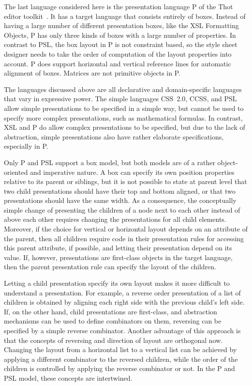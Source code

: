  The last language considered here is the presentation language P of the Thot editor toolkit~\cite{thot}. It has a target language that consists entirely of boxes. Instead of having a large number of different presentation boxes, like the XSL Formatting Objects, P has only three kinds of boxes with a large number of properties. In contrast to PSL, the box layout in P is not constraint based, so the style sheet designer needs to take the order of computation of the layout properties into account. P does support horizontal and vertical reference lines for automatic alignment of boxes. Matrices are not primitive objects in P.

 The languages discussed above are all declarative and domain-specific languages that vary in expressive power. The simple languages CSS~2.0, CCSS, and PSL allow simple presentations to be specified in a simple way, but cannot be used to specify more complex presentations, such as mathematical formulas. In contrast, XSL and P do allow complex presentations to be specified, but due to the lack of abstraction, simple presentations also have rather elaborate specifications, especially in P. 

Only P and PSL support a box model, but both models are of a rather object-oriented and imperative nature. A box can specify its own position properties relative to its parent or siblings, but it is not possible to state at parent level that two child presentations should have their top and bottom aligned, or that two presentations should have the same width. As a consequence, the conceptually simple change of presenting the children of a node next to each other instead of above each other requires changing the presentations for all child elements. Moreover, if the choice for vertical or horizontal layout depends on an attribute of the parent, then all children require code in their presentation rules for accessing this parent attribute, if possible, and letting their presentation depend on its value. If, however, presentations are first-class objects in the target language, then the parent presentation rule can specify the layout of the children.

Letting a child presentation specify its own layout makes it more difficult to understand a presentation. For example, a reverse order presentation of a list of children is obtained by aligning each right side with the previous child's left side. If, on the other hand, child presentations are first-class, and abstraction mechanisms can be used to define combinators on them, reversing can be specified by a simple reverse combinator. Another advantage of this approach is that the concepts of reversing and direction of layout are orthogonal now. Changing the layout from a horizontal list to a vertical list can be achieved by applying a different combinator to the reversed children, while the order of the children is controlled by applying the reverse combinator or not. In the P and PSL model, these concepts are intertwined.

